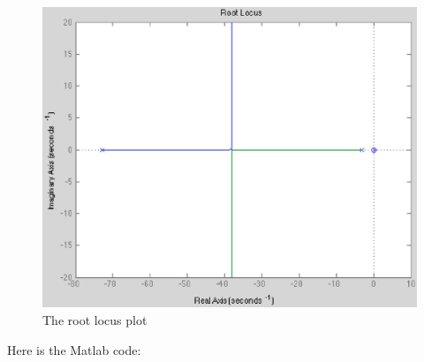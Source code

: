 \documentclass{notes}
\begin{document}
\begin{figure}[!h]
  \begin{center}
    \includegraphics[width=4.5 in]{pics/performance_measurements/root_locus.eps}
  \end{center}
  \caption{The root locus plot}
  \label{fig:root_locus}
\end{figure}

\newpage
Here is the Matlab code:
\end{document}

